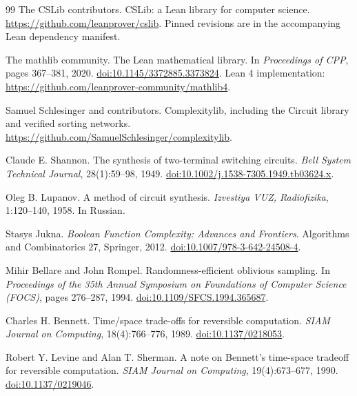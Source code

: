 \documentclass[11pt]{article}
\theoremstyle{definition}
\theoremstyle{remark}
\numberwithin{equation}{section}
\begin{document}
\begin{thebibliography}{99}
The CSLib contributors.
\newblock CSLib: a Lean library for computer science.
\newblock \url{https://github.com/leanprover/cslib}.
\newblock Pinned revisions are in the accompanying Lean dependency manifest.

The mathlib community.
\newblock The Lean mathematical library.
\newblock In \emph{Proceedings of CPP}, pages 367--381, 2020.
\newblock \href{https://doi.org/10.1145/3372885.3373824}{doi:10.1145/3372885.3373824}.
\newblock Lean 4 implementation: \url{https://github.com/leanprover-community/mathlib4}.

Samuel Schlesinger and contributors.
\newblock Complexitylib, including the Circuit library and verified sorting networks.
\newblock \url{https://github.com/SamuelSchlesinger/complexitylib}.

Claude E. Shannon.
\newblock The synthesis of two-terminal switching circuits.
\newblock \emph{Bell System Technical Journal}, 28(1):59--98, 1949.
\newblock \href{https://doi.org/10.1002/j.1538-7305.1949.tb03624.x}{doi:10.1002/j.1538-7305.1949.tb03624.x}.

Oleg B. Lupanov.
\newblock A method of circuit synthesis.
\newblock \emph{Izvestiya VUZ, Radiofizika}, 1:120--140, 1958.
\newblock In Russian.

Stasys Jukna.
\newblock \emph{Boolean Function Complexity: Advances and Frontiers}.
\newblock Algorithms and Combinatorics 27, Springer, 2012.
\newblock \href{https://doi.org/10.1007/978-3-642-24508-4}{doi:10.1007/978-3-642-24508-4}.

Mihir Bellare and John Rompel.
\newblock Randomness-efficient oblivious sampling.
\newblock In \emph{Proceedings of the 35th Annual Symposium on Foundations of
Computer Science (FOCS)}, pages 276--287, 1994.
\newblock \href{https://doi.org/10.1109/SFCS.1994.365687}{doi:10.1109/SFCS.1994.365687}.

Charles H. Bennett.
\newblock Time/space trade-offs for reversible computation.
\newblock \emph{SIAM Journal on Computing}, 18(4):766--776, 1989.
\newblock \href{https://doi.org/10.1137/0218053}{doi:10.1137/0218053}.

Robert Y. Levine and Alan T. Sherman.
\newblock A note on Bennett's time-space tradeoff for reversible computation.
\newblock \emph{SIAM Journal on Computing}, 19(4):673--677, 1990.
\newblock \href{https://doi.org/10.1137/0219046}{doi:10.1137/0219046}.


\end{thebibliography}
\end{document}
